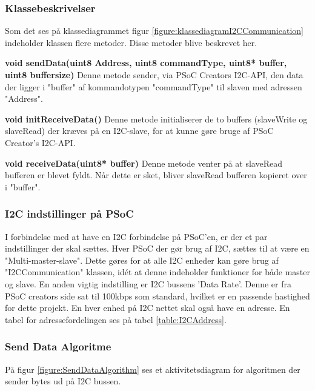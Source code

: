 \subsubsection{Klassebeskrivelser}
Som det ses på klassediagrammet figur \ref{figure:klassediagramI2CCommunication} indeholder klassen flere metoder. Disse metoder blive beskrevet her.\newline

\noindent\textbf{void sendData(uint8 Address, uint8 commandType, uint8* buffer, uint8 buffersize)}\newline
Denne metode sender, via PSoC Creators I2C-API, den data der ligger i "buffer" af kommandotypen "commandType" til slaven med adressen "Address". \newline

\noindent\textbf{void initReceiveData()} \newline 
Denne metode initialiserer de to buffers (slaveWrite og slaveRead) der kræves på en I2C-slave, for at kunne gøre bruge af PSoC Creator's I2C-API. \newline

\noindent\textbf{void receiveData(uint8* buffer)}\newline
Denne metode venter på at slaveRead bufferen er blevet fyldt. Når dette er sket, bliver slaveRead bufferen kopieret over i "buffer".

\subsubsection{I2C indstillinger på PSoC}
I forbindelse med at have en I2C forbindelse på PSoC'en, er der et par indstillinger der skal sættes. Hver PSoC der gør brug af I2C, sættes til at være en "Multi-master-slave". Dette gøres for at alle I2C enheder kan gøre brug af "I2CCommunication" klassen, idét at denne indeholder funktioner for både master og slave. 
En anden vigtig indstilling er I2C bussens 'Data Rate'. Denne er fra PSoC creators side sat til 100kbps som standard, hvilket er en passende hastighed for dette projekt.
En hver enhed på I2C nettet skal også have en adresse. En tabel for adressefordelingen ses på tabel \ref{table:I2CAddress}.

\subsubsection{Send Data Algoritme}

På figur \ref{figure:SendDataAlgorithm} ses et aktivitetsdiagram for algoritmen der sender bytes ud på I2C bussen.

